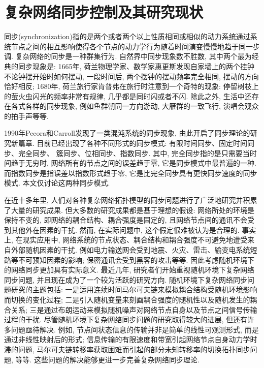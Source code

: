\section{复杂网络同步控制及其研究现状}
同步(synchronization)指的是两个或者两个以上性质相同或相似的动力系统通过系统节点之间的相互影响使得各个节点的动力学行为随着时间演变慢慢地趋于同一步调. 复杂网络的同步是一种群集行为. 自然界中同步现象数不胜数, 其中两个最为经典的同步现象是: 1665年, 荷兰物理学家、数学家惠更斯发现自家墙上的两个挂钟不论钟摆开始时如何摆动, 一段时间后, 两个摆钟的摆动频率完全相同, 摆动的方向恰好相反; 1680年, 荷兰旅行家肯普弗在旅行时注意到一个奇特的现象: 停留树枝上的萤火虫闪光的频率非常有规律, 几乎都是同时闪或者不闪. 除此之外, 生活中还存在各式各样的同步现象, 例如鱼群朝同一方向游动, 大雁群的一致飞行, 演唱会观众的拍手声等等.

1990年Pecora和Carroll发现了一类混沌系统的同步现象, 由此开启了同步理论的研究新篇章. 目前已经出现了各种不同形式的同步模式:
有限时间同步、固定时间同步、完全同步、 簇同步、位相同步、指数同步. 其中, 完全同步指的是只需要当时间趋于无穷时, 网络所有的节点之间的误差趋于零, 它是同步模式中最普遍的一种. 而指数同步是指误差以指数形式趋于零, 它是比完全同步具有更快同步速度的同步模式. 本文仅讨论这两种同步模式.

在近十多年里, 人们对各种复杂网络拓扑模型的同步问题进行了广泛地研究并积累了大量的研究成果. %
但大多数的研究成果都是基于理想的假设: 网络所处的环境是保持不变的, 即网络的耦合结构、耦合强度是固定的, 且网络节点间的通讯不会受到其他外在因素的干扰. 然而, 在实际问题中, 这个假定很难被认为是合理的. 事实上, 在现实应用中, 网络系统的节点状态、耦合结构和耦合强度不可避免地遭受来自外部随机因素的干扰.
例如电力输送网会受到地震、火灾、雷击、输变电系统短路等不可预知因素的影响; 保密通讯会受到黑客的攻击等等.
因此考虑随机环境下的网络同步更加具有实际意义.
最近几年, 研究者们开始重视随机环境下复杂网络同步问题, 并且现在成为了一个较为活跃的研究方向. 随机环境下复杂网络同步问题研究的主题包括: 一是运用连续时间马尔可夫链来模拟耦合结构受随机环境影响而切换的变化过程; 二是引入随机变量来刻画耦合强度的随机性以及随机发生的耦合关系; 三是通过布朗运动来模拟随机噪声对网络节点自身以及节点之间信号传输过程的干扰. 尽管随机环境下复杂网络同步问题的研究取得较大的进展, 但还有许多问题亟待解决.
例如, 节点间状态信息的传输并非是简单的线性可观测形式, 而是通过非线性映射后的形式; 信息传输的有限速度和带宽引起网络节点自身动力学时滞的问题, 马尔可夫链转移率获取困难而引起的部分未知转移率的切换拓扑同步问题, 等等. 这些问题的解决能够更进一步完善复杂网络同步理论.

